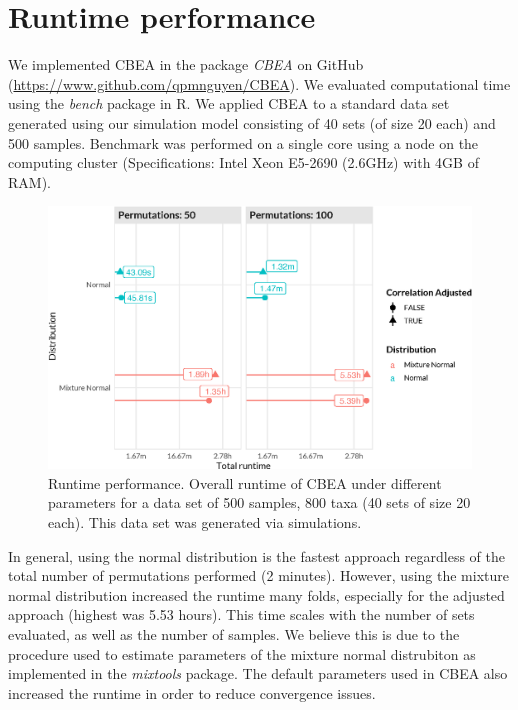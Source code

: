 \clearpage
\section{Runtime performance}

We implemented CBEA in the package \emph{CBEA} on GitHub (\url{https://www.github.com/qpmnguyen/CBEA}). We evaluated computational time using the \emph{bench} package in R. We applied CBEA to a standard data set generated using our simulation model consisting of 40 sets (of size 20 each) and 500 samples. Benchmark was performed on a single core using a node on the computing cluster (Specifications: Intel Xeon E5-2690 (2.6GHz) with 4GB of RAM). 

\begin{figure}[!h]
    \centering
    \includegraphics[width=\linewidth]{figures/appC_fs6.eps}
    \caption[CBEA Runtime performance]{Runtime performance. Overall runtime of CBEA under different parameters for a data set of 500 samples, 800 taxa (40 sets of size 20 each). This data set was generated via simulations.}
    \label{fig:c6}
\end{figure}

In general, using the normal distribution is the fastest approach regardless of the total number of permutations performed (2 minutes). However, using the mixture normal distribution increased the runtime many folds, especially for the adjusted approach (highest was 5.53 hours). This time scales with the number of sets evaluated, as well as the number of samples. We believe this is due to the procedure used to estimate parameters of the mixture normal distrubiton as implemented in the \emph{mixtools} package. The default parameters used in CBEA also increased the runtime in order to reduce convergence issues.  

